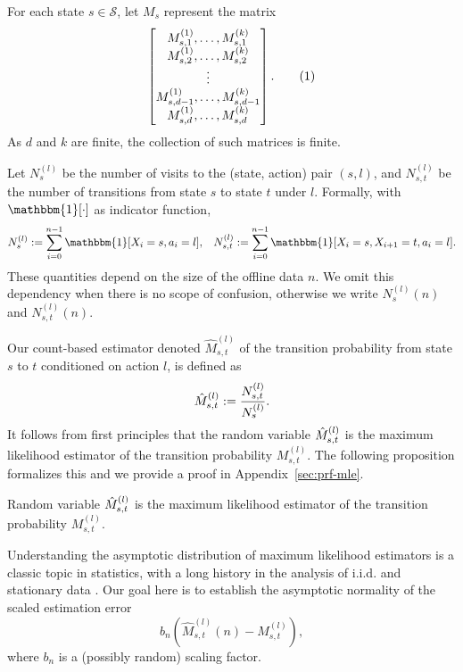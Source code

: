 \documentclass[twoside,11pt]{article}
\newcommand{\pow}[1]{^{(#1)}}%
\numberwithin{equation}{section}
\newcommand{\lp}{\left(}
\newcommand{\rp}{\right)}
\newcommand\numberthis{\addtocounter{equation}{1}\tag{\theequation}}
\newcommand{\indicator}{\mathbbm{1}}
\begin{document}
For each state $s \in \mathcal S$, let $M_s$ represent the matrix
\begin{align*}
\begin{bmatrix}
     M_{s,1} \pow 1,\dots,M_{s,1} \pow k\\
     M_{s,2} \pow 1,\dots,M_{s,2} \pow k\\
     \vdots \\
     M_{s,d-1} \pow 1,\dots,M_{s,d-1} \pow k\\
     M_{s,d} \pow 1,\dots,M_{s,d} \pow k
\end{bmatrix}
.\numberthis \label{eq:M_s}
\end{align*}
As $d$ and $k$ are finite, the collection of such matrices is finite.

Let $N_s\pow l$ be the number of visits to the (state, action) pair $(s,l)$, and $N_{s,t}\pow l$ be the number of transitions from state $s$ to state $t$ under $l$. Formally, with $\indicator[\cdot]$ as indicator function, 
\begin{align*}
    N_s \pow l & :=\sum_{i=0}^{n-1} \indicator[X_i=s,a_i=l], & N_{s,t} \pow l :=\sum_{i=0}^{n-1} \indicator[X_i=s,X_{i+1}=t,a_{i}=l].  
\end{align*}
These quantities depend on the size of the offline data $n$.
We omit this dependency when there is no scope of confusion, otherwise we write $N_s \pow l(n)$ and $N_{s,t} \pow l(n)$.

Our count-based estimator denoted $\hat M_{s,t}\pow l$ of the transition probability from state $s$ to $t$ conditioned on action $l$, is defined as
\begin{align}
\label{eq:estimator}
    \Hat{M}_{s,t}^{(l)} := \frac{ N_{s,t}^{(l)} }{ N_s^{(l)}}.
\end{align}
It follows from first principles that the random variable $\Hat{M}_{s,t}^{(l)}$ is the maximum likelihood estimator of the transition probability $M_{s,t} \pow l$. The following proposition formalizes this and we provide a proof in Appendix~\ref{sec:prf-mle}.
\begin{proposition}
\label{prop:mle}
Random variable $\Hat{M}_{s,t}^{(l)}$ is the maximum likelihood estimator of the transition probability $M_{s,t} \pow l$.
\end{proposition}

Understanding the asymptotic distribution of maximum likelihood estimators is a classic topic in statistics, with a long history in the analysis of i.i.d. and stationary data \citep{cramer1946mathematical, billingsley1961statistical}. 
Our goal here is to establish the asymptotic normality of the scaled estimation error
\[
b_n\lp \hat M_{s,t}\pow l (n) -  M_{s,t}\pow l \rp,
\]
where $b_n$ is a (possibly random) scaling factor.
\end{document}
